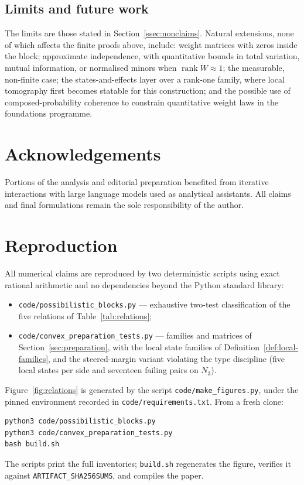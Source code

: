 \documentclass[11pt,a4paper]{article}
\newcommand{\rk}{\operatorname{rank}}
\begin{document}
  \subsection{Limits and future work}
    \label{ssec:limits}

    The limits are those stated in Section~\ref{ssec:nonclaims}.
    Natural extensions, none of which affects the finite proofs above, include: weight matrices with zeros
    inside the block; approximate independence, with quantitative bounds in total variation, mutual
    information, or normalised minors when $\rk W \approx 1$; the measurable, non-finite case; the
    states-and-effects layer over a rank-one family, where local tomography first becomes statable for this
    construction; and the possible use of composed-probability coherence to constrain quantitative weight
    laws in the foundations programme.

  \section*{Acknowledgements}
    Portions of the analysis and editorial preparation benefited from iterative interactions with large
    language models used as analytical assistants.
    All claims and final formulations remain the sole responsibility of the author.

  \appendix

  \section{Reproduction}
  \label{app:repro}

    All numerical claims are reproduced by two deterministic scripts using exact rational arithmetic and no
    dependencies beyond the Python standard library:
    \begin{itemize}
      \item \texttt{code/possibilistic\_blocks.py} --- exhaustive two-test classification of the five
      relations of Table~\ref{tab:relations};
      \item \texttt{code/convex\_preparation\_tests.py} --- families and matrices of
      Section~\ref{sec:preparation}, with the local state families of Definition~\ref{def:local-families},
      and the steered-margin variant violating the type discipline (five local states per side and
      seventeen failing pairs on $N_3$).
    \end{itemize}
    Figure~\ref{fig:relations} is generated by the script \texttt{code/make\_figures.py}, under the pinned
    environment recorded in \texttt{code/requirements.txt}.
    From a fresh clone:
    \begin{verbatim}
python3 code/possibilistic_blocks.py
python3 code/convex_preparation_tests.py
bash build.sh
    \end{verbatim}
    The scripts print the full inventories; \texttt{build.sh} regenerates the figure, verifies it against
    \texttt{ARTIFACT\_SHA256SUMS}, and compiles the paper.

  
  
\end{document}
